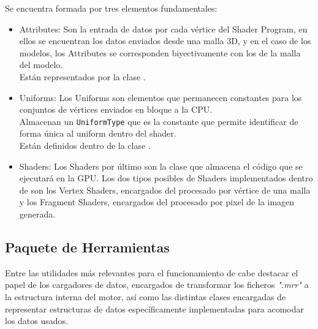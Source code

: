 Se encuentra formada por tres elementos fundamentales:
\begin{itemize}
\item Attributes: Son la entrada de datos por cada vértice del Shader Program, en ellos se encuentran los datos enviados desde una malla 3D, y en el caso de los modelos, los Attributes se corresponden biyectivamente con los \rorefbufferkey de la malla del modelo.\\
Están representados por la clase \rorefattribute.
\item Uniforms: Los Uniforms son elementos que permanecen constantes para los conjuntos de vértices enviados en bloque a la CPU.\\
Almacenan un \texttt{UniformType} que es la constante que permite identificar de forma única al uniform dentro del shader.\\
Están definidos dentro de la clase \rorefuniform.
\item Shaders: Los Shaders por último son la clase que almacena el código que se ejecutará en la GPU. Los dos tipos posibles de Shaders implementados dentro de \robotto son los Vertex Shaders, encargados del procesado por vértice de una malla y los Fragment Shaders, encargados del procesado por pixel de la imagen generada.
\end{itemize}


\subsection{Paquete de Herramientas}
Entre las utilidades más relevantes para el funcionamiento de \robotto cabe destacar el papel de los cargadores de datos, encargados de transformar los ficheros \textit{".mrr"} a la estructura interna del motor, así como las distintas clases encargadas de representar estructuras de datos específicamente implementadas para acomodar los datos usados.


